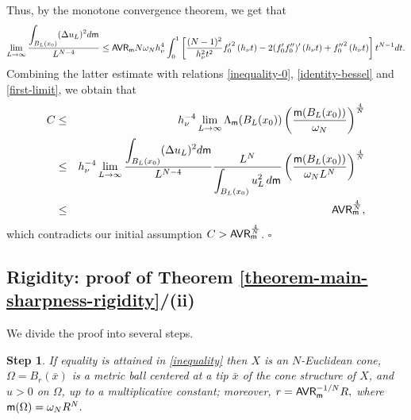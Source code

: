 \documentclass[11pt, reqno]{amsart}
\newcommand{\ds}{\displaystyle}
\numberwithin{equation}{section}
\begin{document}
		Thus, by the monotone convergence theorem, we get that
		$$\lim_{L\to \infty}\frac{\ds\int_{B_L(x_0)}(\Delta u_L)^2{\rm d}{\sf m}}{L^{N-4}}\leq {\sf AVR}_ {\sf m}	N\omega_N {h_\nu^4}\ds\int_0^1 \left[\frac{(N-1)^2}{h_\nu^2t^2}{f_0'}^2\left(h_\nu t\right)-2(f_0'f_0'')'\left(h_\nu t\right)+{f_0''}^2\left(h_\nu t\right)\right]t^{N-1}{\rm d}t.$$
		Combining the latter estimate with relations \eqref{inequality-0}, \eqref{identity-bessel}  and \eqref{first-limit},  we obtain that
		\begin{eqnarray*}
			C&\leq&h_\nu^{-4} \lim_{L\to \infty} \Lambda_{\sf m}(B_L(x_0))\left(\frac{{\sf m}(B_L(x_0))}{\omega_N}\right)^\frac{4}{N}\\&\leq &
			h_\nu^{-4}\lim_{L\to \infty}  \frac{\ds\int_{B_L(x_0)}(\Delta u_L)^2{\rm d}{\sf m}}{L^{N-4}}\frac{L^N}{\ds\int_{B_L(x_0)}u_L^2\,{\rm d}{\sf m}}\left(\frac{{\sf m}(B_L(x_0))}{\omega_NL^N}\right)^\frac{4}{N}\\&\leq &{\sf AVR}_ {\sf m}^\frac{4}{N},
		\end{eqnarray*}
		which contradicts our initial assumption 
		$C>{\sf AVR}_ {\sf m}^\frac{4}{N}$. \hfill $\square$
		
		\subsection{Rigidity:  proof of  Theorem \ref{theorem-main-sharpness-rigidity}/(ii)} We divide the proof into several steps.  
		\smallskip

  	\textbf{Step 1}. \textit{If equality is attained in \eqref{inequality} then $X$ is an $N$-Euclidean cone, $\Omega=B_r(\bar x)$ is a metric ball centered at a tip $\bar{x}$ of the cone structure of $X$, and  $u>0$ on $\Omega$, up to a multiplicative constant; moreover, $r={\sf AVR}_ {\sf m}^{-{1}/{N}}R,$ where ${\sf m}(\Omega)=\omega_NR^N.$}
		
\end{document}
